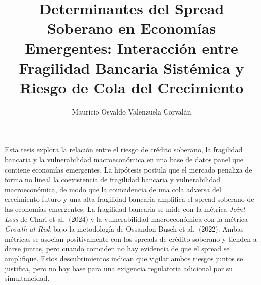 \documentclass{umemoria}
\author{Mauricio Osvaldo Valenzuela Corvalán}
\title{Determinantes del Spread Soberano en Economías Emergentes: Interacción entre Fragilidad Bancaria Sistémica y Riesgo de Cola del Crecimiento}
\begin{document}
\frontmatter

\maketitle

\begin{resumen}
Esta tesis explora la relación entre el riesgo de crédito soberano, la fragilidad bancaria y la vulnerabilidad macroeconómica en una base de datos panel que contiene economías emergentes. La hipótesis postula que el mercado penaliza de forma no lineal la coexistencia de fragilidad bancaria y vulnerabilidad macroeconómica, de modo que la coincidencia de una cola adversa del crecimiento futuro y una alta fragilidad bancaria amplifica el spread soberano de las economías emergentes. La fragilidad bancaria se mide con la métrica \textit{Joint Loss} de Chari et al.\ (2024) y la vulnerabilidad macroeconómica con la métrica \textit{Growth-at-Risk} bajo la metodología de Ossandon Busch et al.\ (2022). Ambas métricas se asocian positivamente con los spreads de crédito soberano y tienden a darse juntas, pero cuando coinciden no hay evidencia de que el spread se amplifique. Estos descubrimientos indican que vigilar ambos riesgos juntos se justifica, pero no hay base para una exigencia regulatoria adicional por su simultaneidad.
\end{resumen}



\setcounter{tocdepth}{2}
\tableofcontents
\listoftables
\listoffigures

\mainmatter












\begin{appendices}







\end{appendices}
\end{document}
